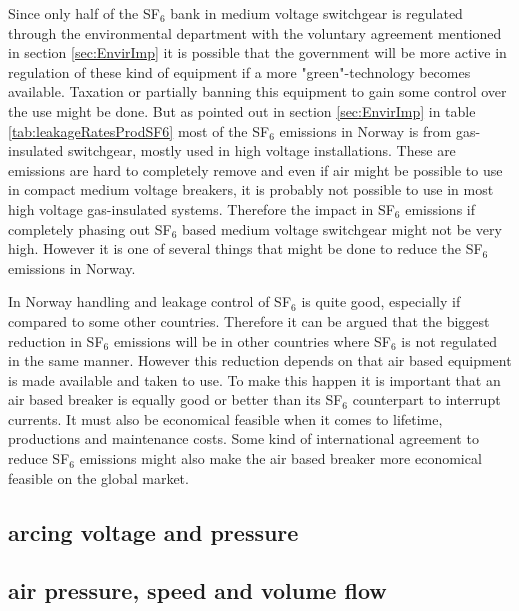 \documentclass[10pt,a4paper]{article} %
\begin{document}
Since only half of the SF$_6$ bank in medium voltage switchgear is regulated through the environmental department with the voluntary agreement mentioned in section \ref{sec:EnvirImp} it is possible that the government will be more active in regulation of these kind of equipment if a more "green"-technology becomes available. Taxation or partially banning this equipment to gain some control over the use might be done. But as pointed out in section \ref{sec:EnvirImp} in table \ref{tab:leakageRatesProdSF6} most of the SF$_6$ emissions in Norway is from gas-insulated switchgear, mostly used in high voltage installations. These are emissions are hard to completely remove and even if air might be possible to use in compact medium voltage breakers, it is probably not possible to use in most high voltage gas-insulated systems. Therefore the impact in SF$_6$ emissions if completely phasing out SF$_6$ based medium voltage switchgear might not be very high. However it is one of several things that might be done to reduce the SF$_6$ emissions in Norway.

In Norway handling and leakage control of SF$_6$ is quite good, especially if compared to some other countries. Therefore it can be argued that the biggest reduction in SF$_6$ emissions will be in other countries where SF$_6$ is not regulated in the same manner. However this reduction depends on that air based equipment is made available and taken to use. To make this happen it is important that an air based breaker is equally good or better than its SF$_6$ counterpart to interrupt currents. It must also be economical feasible when it comes to lifetime, productions and maintenance costs. Some kind of international agreement to reduce SF$_6$ emissions might also make the air based breaker more economical feasible on the global market.

\subsection{arcing voltage and pressure}

\subsection{air pressure, speed and volume flow}
\newpage
\end{document}
